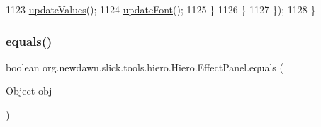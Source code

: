\begin{DoxyCode}
1123                         \mbox{\hyperlink{classorg_1_1newdawn_1_1slick_1_1tools_1_1hiero_1_1_hiero_1_1_effect_panel_afca6e77363d958d8cfae9344755c2526}{updateValues}}();
1124                         \mbox{\hyperlink{classorg_1_1newdawn_1_1slick_1_1tools_1_1hiero_1_1_hiero_aaee4b931c33090913c970c8484c90af7}{updateFont}}();
1125                     \}
1126                 \}
1127             \});
1128         \}
\end{DoxyCode}
\mbox{\label{classorg_1_1newdawn_1_1slick_1_1tools_1_1hiero_1_1_hiero_1_1_effect_panel_a97d2de161b78632fe5b5b5b9f794fa0d}} 
\subsubsection{\texorpdfstring{equals()}{equals()}}
{\footnotesize\ttfamily boolean org.\+newdawn.\+slick.\+tools.\+hiero.\+Hiero.\+Effect\+Panel.\+equals (\begin{DoxyParamCaption}\item[{Object}]{obj }\end{DoxyParamCaption})\hspace{0.3cm}{\ttfamily [inline]}}



